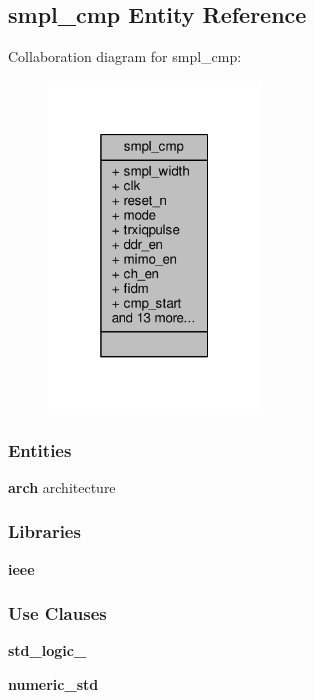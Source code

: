 \subsection{smpl\+\_\+cmp Entity Reference}
\label{classsmpl__cmp}


Collaboration diagram for smpl\+\_\+cmp\+:\nopagebreak
\begin{figure}[H]
\begin{center}
\leavevmode
\includegraphics[width=160pt]{d6/df9/classsmpl__cmp__coll__graph}
\end{center}
\end{figure}
\subsubsection*{Entities}
\begin{DoxyCompactItemize}
\item 
{\bf arch} architecture
\end{DoxyCompactItemize}
\subsubsection*{Libraries}
 \begin{DoxyCompactItemize}
\item 
{\bf ieee} 
\end{DoxyCompactItemize}
\subsubsection*{Use Clauses}
 \begin{DoxyCompactItemize}
\item 
{\bf std\+\_\+logic\+\_}   
\item 
{\bf numeric\+\_\+std}   
\end{DoxyCompactItemize}
